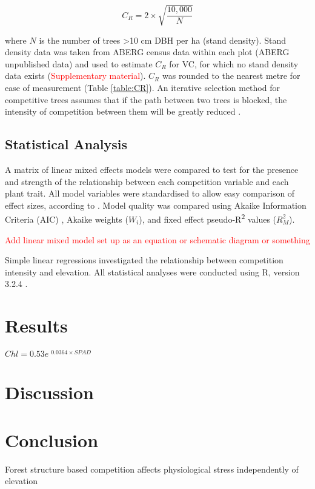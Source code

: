 \documentclass[a4paper,11pt]{article}
\newcommand{\todo}[1]{\textcolor{red}{#1}}   %
\begin{document}
\begin{equation}
\label{eq:CR}
C_R = 2 \times \sqrt{\frac{10,000}{N}}
\end{equation}

where $N$ is the number of trees \textgreater10 cm DBH per ha (stand density). Stand density data was taken from ABERG census data within each plot (ABERG unpublished data) and used to estimate $C_R$ for VC, for which no stand density data exists (\todo{Supplementary material}). $C_R$ was rounded to the nearest metre for ease of measurement (Table \ref{table:CR}). An iterative selection method for competitive trees assumes that if the path between two trees is blocked, the intensity of competition between them will be greatly reduced \citep{Gadow1999}.


\subsection*{Statistical Analysis}

A matrix of linear mixed effects models were compared to test for the presence and strength of the relationship between each competition variable and each plant trait. All model variables were standardised to allow easy comparison of effect sizes, according to \citep{Gelman2008, Grueber2011, Gelman2014}. Model quality was compared using Akaike Information Criteria (AIC) \citep{Akaike1998}, Akaike weights ($W_i$), and fixed effect pseudo-R\textsuperscript{2} values ($R_M^2$). 

\todo{Add linear mixed model set up as an equation or schematic diagram or something}

Simple linear regressions investigated the relationship between competition intensity and elevation. All statistical analyses were conducted using R, version 3.2.4 \citep{R2016}.

\section*{Results}
   $Chl = 0.53e^{\begin{matrix} 0.0364 \times SPAD \end{matrix}}$

\section*{Discussion}

\section*{Conclusion}


Forest structure based competition affects physiological stress independently of elevation

\end{document}
